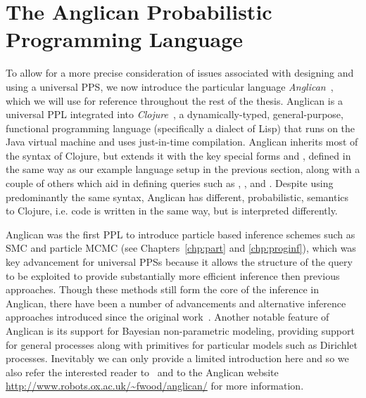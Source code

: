 
\section{The Anglican Probabilistic Programming Language}
\label{sec:probprog:anglican}

To allow for a more precise consideration of issues associated with designing and using a universal
PPS, we now introduce the particular language \emph{Anglican}~\citep{wood2014new,tolpin2016design},
which we will use for reference throughout the rest of the thesis.  
Anglican is a universal PPL integrated into \emph{Clojure}~\citep{hickey2008clojure}, a dynamically-typed, general-purpose, functional
programming language (specifically a dialect of Lisp) that runs on the Java virtual machine and uses just-in-time compilation.
Anglican inherits most of the syntax of Clojure, but extends it with the key
special forms \sample and \observe \citep{tolpin2015probabilistic,tolpin2016design}, defined in the same way as
our example language setup in the previous section, along with a couple of others which aid in defining queries
such as \mem, \store, and \retrieve.  Despite using predominantly the same syntax, Anglican has different, 
probabilistic, semantics to Clojure, i.e. code is written in the same way, but is interpreted differently.

Anglican was the first PPL to introduce particle based 
inference schemes such as SMC and particle MCMC (see Chapters~\ref{chp:part} and \ref{chp:proginf}), which was
key advancement for universal PPSs because it allows the structure of the query to be exploited to provide
substantially more efficient inference then previous approaches.  Though these methods still form the core
of the inference in Anglican, there have been a number of advancements and alternative inference approaches introduced since
the original work~\citep{paige2014asynchronous,tolpin-socs-2015,tolpin2015output,vandemeent_aistats_2015,
	rainforth2016bayesian,rainforth2016interacting,le2017inference}.  Another notable feature of Anglican is its
support for Bayesian non-parametric modeling, providing support for general processes along with
primitives for particular models such as Dirichlet processes.  Inevitably we can only provide a limited 
introduction here and so we also refer the interested reader to~\cite{tolpin2016design} and to the Anglican website {\small\url{http://www.robots.ox.ac.uk/~fwood/anglican/}} for more information.

